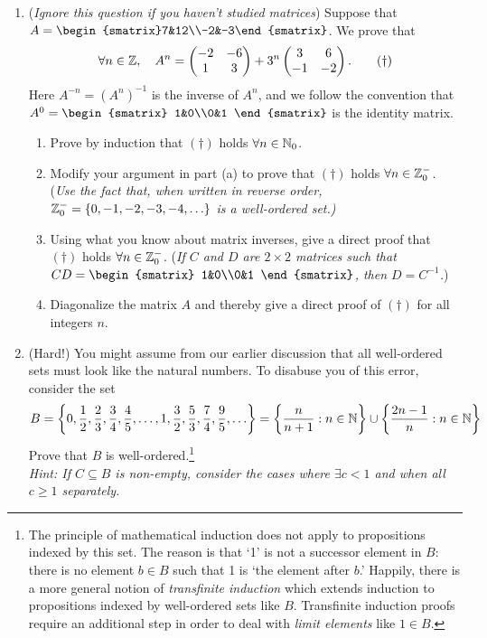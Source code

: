 \begin{exercises}{}{}
\begin{enumerate}
	\item (\emph{Ignore this question if you haven't studied matrices}) Suppose that $A=\begin{smatrix}7&12\\-2&-3\end{smatrix}$. We prove that
	\[\forall n\in\mathbb{Z},\quad A^n=\begin{pmatrix}-2&-6\\1&3\end{pmatrix}+3^n\begin{pmatrix}3&6\\-1&-2\end{pmatrix}.\tag*{($\dag$)}\]
	Here $A^{-n}=(A^n)^{-1}$ is the inverse of $A^n$, and we follow the convention that $A^0=\begin{smatrix}
	1&0\\0&1
	\end{smatrix}$ is the identity matrix.
	\begin{enumerate}
  	\item Prove by induction that $(\dag)$ holds $\forall n\in\mathbb{N}_0$.
		\item Modify your argument in part (a) to prove that $(\dag)$ holds $\forall n\in\mathbb{Z}^-_0$. (\emph{Use the fact that, when written in reverse order, $\mathbb{Z}_0^-=\{0,-1,-2,-3,-4,\ldots\}$ is a well-ordered set.)}
		\item Using what you know about matrix inverses, give a direct proof that $(\dag)$ holds $\forall n\in\mathbb{Z}^-_0$. 		(\emph{If $C$ and $D$ are $2\times 2$ matrices such that $CD=\begin{smatrix}
		1&0\\0&1
		\end{smatrix}$, then $D=C^{-1}$.})
		\item Diagonalize the matrix $A$ and thereby give a direct proof of $(\dag)$ for all integers $n$.
	\end{enumerate}
	
	\item (Hard!) You might assume from our earlier discussion that all well-ordered sets must look like the natural numbers.	To disabuse you of this error, consider the set
	\[B=\left\{0,\frac 12,\frac 23,\frac 34,\frac 45,\ldots,1,\frac 32,\frac 53,\frac 74,\frac 95,\ldots\right\}=\left\{\frac n{n+1}:n\in\mathbb{N}\right\}\cup\left\{\frac{2n-1}{n}:n\in\mathbb{N}\right\}\]
	Prove that $B$ is well-ordered.\footnote{The principle of mathematical induction does not apply to propositions indexed by this set. The reason is that `1' is not a successor element in $B$: there is no element $b\in B$ such that 1 is `the element after $b$.' Happily, there is a more general notion of \emph{transfinite induction} which extends induction to propositions indexed by well-ordered sets like $B$. Transfinite induction proofs require an additional step in order to deal with \emph{limit elements} like $1\in B$.}\\[2pt]
	\emph{Hint: If $C\subseteq B$ is non-empty, consider the cases where $\exists c<1$ and when all $c\ge 1$ separately.}


\end{enumerate}
\end{exercises}
